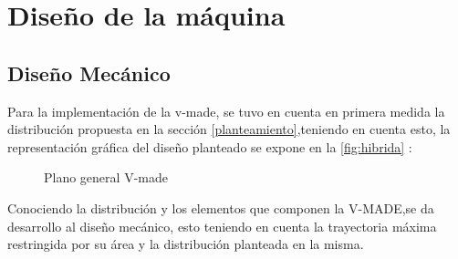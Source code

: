 \clearpage %
\chapter{Dise\~no de la m\'aquina}

\section{Diseño Mecánico}\label{mecanico}

Para la implementación de la v-made, se tuvo en cuenta en primera medida la distribución propuesta en la sección \ref{planteamiento},teniendo en cuenta esto, la representación gráfica del diseño planteado se expone en la \autoref{fig:hibrida} : 


\begin{figure}[H]
    \centering
    \caption{Plano general V-made}
    \label{fig:hibrida}
\end{figure}

Conociendo la distribución y los elementos que componen la V-MADE,se da desarrollo al diseño mecánico, esto teniendo en cuenta la trayectoria máxima restringida por su área y la distribución planteada en la misma. \\

